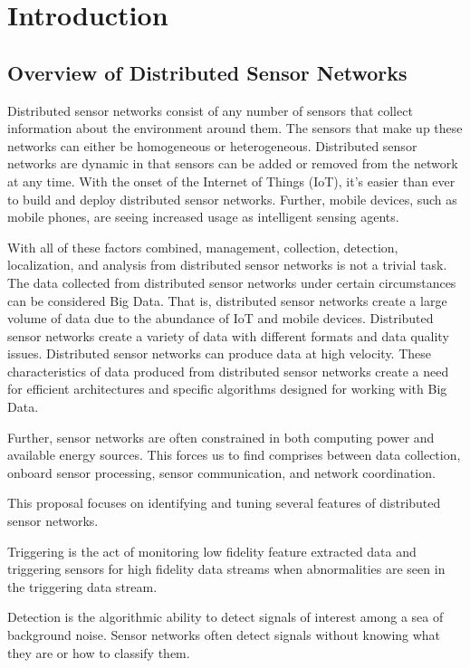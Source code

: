 \chapter{Introduction}

\section{Overview of Distributed Sensor Networks}
Distributed sensor networks consist of any number of sensors that collect information about the environment around them. The sensors that make up these networks can either be homogeneous or heterogeneous. Distributed sensor networks are dynamic in that sensors can be added or removed from the network at any time. With the onset of the Internet of Things (IoT), it’s easier than ever to build and deploy distributed sensor networks. Further, mobile devices, such as mobile phones, are seeing increased usage as intelligent sensing agents.

With all of these factors combined, management, collection, detection, localization, and analysis from distributed sensor networks is not a trivial task. The data collected from distributed sensor networks under certain circumstances can be considered Big Data. That is, distributed sensor networks create a large volume of data due to the abundance of IoT and mobile devices. Distributed sensor networks create a variety of data with different formats and data quality issues. Distributed sensor networks can produce data at high velocity. These characteristics of data produced from distributed sensor networks create a need for efficient architectures and specific algorithms designed for working with Big Data.

Further, sensor networks are often constrained in both computing power and available energy sources. This forces us to find comprises between data collection, onboard sensor processing, sensor communication, and network coordination.

This proposal focuses on identifying and tuning several features of distributed sensor networks. 

Triggering is the act of monitoring low fidelity feature extracted data and triggering sensors for high fidelity data streams when abnormalities are seen in the triggering data stream.

Detection is the algorithmic ability to detect signals of interest among a sea of background noise. Sensor networks often detect signals without knowing what they are or how to classify them. 

